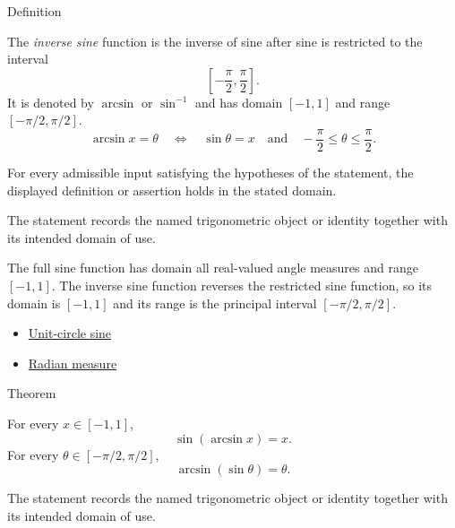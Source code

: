 

\begin{definitionbox}{Definition}
\begin{definition}
\label{def:inverse-sine}
The \emph{inverse sine} function is the inverse of sine after sine is
restricted to the interval
\[
  \left[-\frac{\pi}{2},\frac{\pi}{2}\right].
\]
It is denoted by $\arcsin$ or $\sin^{-1}$ and has domain $[-1,1]$ and range
$[-\pi/2,\pi/2]$.
\[
  \arcsin x=\theta
  \quad\Longleftrightarrow\quad
  \sin\theta=x
  \quad\text{and}\quad
  -\frac{\pi}{2}\leq\theta\leq\frac{\pi}{2}.
\]
\end{definition}
\end{definitionbox}
\begin{remark*}
For every admissible input satisfying the hypotheses of the statement, the
displayed definition or assertion holds in the stated domain.
\end{remark*}

\begin{remark*}[Interpretation]
The statement records the named trigonometric object or identity together with
its intended domain of use.
\end{remark*}

\begin{remark*}
The full sine function has domain all real-valued angle measures and range
$[-1,1]$. The inverse sine function reverses the restricted sine function, so
its domain is $[-1,1]$ and its range is the principal interval
$[-\pi/2,\pi/2]$.
\end{remark*}
\begin{dependencies}
\begin{itemize}
  \item \hyperref[def:unit-circle-sine]{Unit-circle sine}
  \item \hyperref[def:radian-measure]{Radian measure}
\end{itemize}
\end{dependencies}

\begin{theorembox}{Theorem}
\begin{theorem}
\label{thm:inverse-sine-identities}
For every $x\in[-1,1]$,
\[
  \sin(\arcsin x)=x.
\]
For every $\theta\in[-\pi/2,\pi/2]$,
\[
  \arcsin(\sin\theta)=\theta.
\]
\end{theorem}
\end{theorembox}
\begin{remark*}[Interpretation]
The statement records the named trigonometric object or identity together with
its intended domain of use.
\end{remark*}

